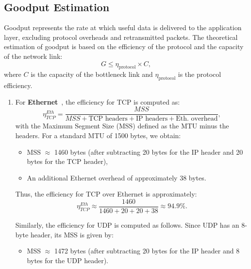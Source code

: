     \subsection{Goodput Estimation} \label{subsec:goodput-estimation}

        Goodput represents the rate at which useful data is delivered to the application layer, excluding protocol overheads and retransmitted packets. 
        The theoretical estimation of goodput is based on the efficiency of the protocol and the capacity of the network link:
        \[
        G \leq \eta_{\text{protocol}} \times C,
        \]
        where \(C\) is the capacity of the bottleneck link and \(\eta_{\text{protocol}}\) is the protocol efficiency.

        \begin{enumerate}

            \item 
                For \textbf{Ethernet}~\cite{ieee8023}, the efficiency for TCP is computed as:
                \[
                \eta_{TCP}^{Eth} = \frac{MSS}{MSS + \text{TCP headers} + \text{IP headers} + \text{Eth. overhead}},
                \]
                with the Maximum Segment Size (MSS) defined as the MTU minus the headers. For a standard MTU of 1500 bytes, we obtain:

                \begin{itemize}
                    \item MSS \(\approx\) 1460 bytes (after subtracting 20 bytes for the IP header and 20 bytes for the TCP header),
                    \item An additional Ethernet overhead of approximately 38 bytes.
                \end{itemize}

                \noindent Thus, the efficiency for TCP over Ethernet is approximately:
                \[
                \eta_{TCP}^{Eth} \approx \frac{1460}{1460 + 20 + 20 + 38} \approx 94.9\%.
                \]

                \noindent Similarly, the efficiency for UDP is computed as follows. Since UDP has an 8-byte header, its MSS is given by:

                \begin{itemize}
                    \item MSS \(\approx\) 1472 bytes (after subtracting 20 bytes for the IP header and 8 bytes for the UDP header).
                \end{itemize}


\end{enumerate}
